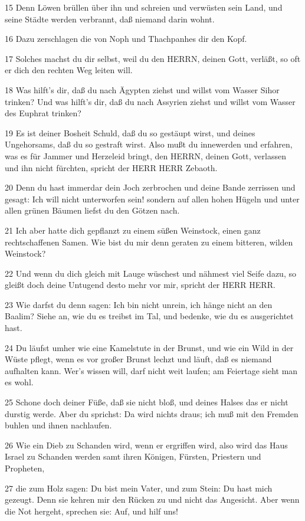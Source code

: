 \par 15 Denn Löwen brüllen über ihn und schreien und verwüsten sein Land, und seine Städte werden verbrannt, daß niemand darin wohnt.
\par 16 Dazu zerschlagen die von Noph und Thachpanhes dir den Kopf.
\par 17 Solches machst du dir selbst, weil du den HERRN, deinen Gott, verläßt, so oft er dich den rechten Weg leiten will.
\par 18 Was hilft's dir, daß du nach Ägypten ziehst und willst vom Wasser Sihor trinken? Und was hilft's dir, daß du nach Assyrien ziehst und willst vom Wasser des Euphrat trinken?
\par 19 Es ist deiner Bosheit Schuld, daß du so gestäupt wirst, und deines Ungehorsams, daß du so gestraft wirst. Also mußt du innewerden und erfahren, was es für Jammer und Herzeleid bringt, den HERRN, deinen Gott, verlassen und ihn nicht fürchten, spricht der HERR HERR Zebaoth.
\par 20 Denn du hast immerdar dein Joch zerbrochen und deine Bande zerrissen und gesagt: Ich will nicht unterworfen sein! sondern auf allen hohen Hügeln und unter allen grünen Bäumen liefst du den Götzen nach.
\par 21 Ich aber hatte dich gepflanzt zu einem süßen Weinstock, einen ganz rechtschaffenen Samen. Wie bist du mir denn geraten zu einem bitteren, wilden Weinstock?
\par 22 Und wenn du dich gleich mit Lauge wüschest und nähmest viel Seife dazu, so gleißt doch deine Untugend desto mehr vor mir, spricht der HERR HERR.
\par 23 Wie darfst du denn sagen: Ich bin nicht unrein, ich hänge nicht an den Baalim? Siehe an, wie du es treibst im Tal, und bedenke, wie du es ausgerichtet hast.
\par 24 Du läufst umher wie eine Kamelstute in der Brunst, und wie ein Wild in der Wüste pflegt, wenn es vor großer Brunst lechzt und läuft, daß es niemand aufhalten kann. Wer's wissen will, darf nicht weit laufen; am Feiertage sieht man es wohl.
\par 25 Schone doch deiner Füße, daß sie nicht bloß, und deines Halses das er nicht durstig werde. Aber du sprichst: Da wird nichts draus; ich muß mit den Fremden buhlen und ihnen nachlaufen.
\par 26 Wie ein Dieb zu Schanden wird, wenn er ergriffen wird, also wird das Haus Israel zu Schanden werden samt ihren Königen, Fürsten, Priestern und Propheten,
\par 27 die zum Holz sagen: Du bist mein Vater, und zum Stein: Du hast mich gezeugt. Denn sie kehren mir den Rücken zu und nicht das Angesicht. Aber wenn die Not hergeht, sprechen sie: Auf, und hilf uns!

